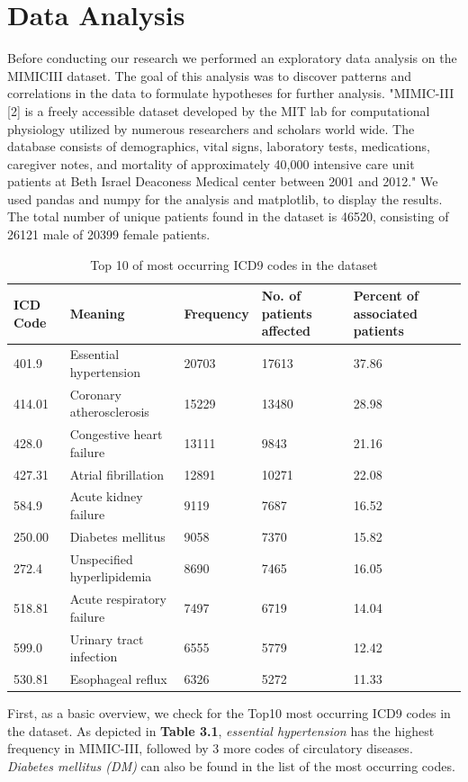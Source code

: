 \documentclass[11pt, a4paper]{book}
\begin{document}
\chapter{Data Analysis}
Before conducting our research we performed an exploratory data analysis on the MIMICIII dataset. The goal of this analysis was to discover patterns and correlations in the data to formulate hypotheses for further analysis. "MIMIC-III [2] is a freely accessible dataset developed by the MIT lab for computational physiology utilized by numerous researchers and scholars world wide. The database consists of demographics, vital signs, laboratory tests, medications, caregiver notes, and mortality of approximately 40,000 intensive care unit patients at Beth Israel Deaconess Medical center between 2001 and 2012." \cite{arya2019exploratory}
We used pandas and numpy for the analysis and matplotlib, to display the results.
The total number of unique patients found in the dataset is 46520, consisting of 26121 male of 20399 female patients.


\begin{table}
\begin{tabular}{l|l|l|l|l}
ICD Code & Meaning & Frequency & No. of patients affected & Percent of associated patients \\
\hline
401.9 & Essential hypertension & 20703 & 17613 & 37.86\\
414.01 &  Coronary atherosclerosis & 15229 & 13480 & 28.98 \\
428.0 & Congestive heart failure &   13111 & 9843 &21.16\\
427.31 & Atrial fibrillation&    12891 & 10271 &  22.08\\
584.9 &  Acute kidney failure &  9119 & 7687& 16.52\\
250.00 & Diabetes mellitus &  9058 & 7370 & 15.82\\
272.4 & Unspecified hyperlipidemia & 8690 & 7465 & 16.05 \\
518.81 &  Acute respiratory failure & 7497 & 6719 & 14.04 \\
599.0 &   Urinary tract infection &  6555 & 5779 & 12.42 \\
530.81 & Esophageal reflux &  6326 & 5272 & 11.33\\
\end{tabular}
\caption{\label{tab:top10-codes-dataset}Top 10 of most occurring ICD9 codes in the dataset}
\end{table}


First, as a basic overview, we check for the Top10 most occurring ICD9 codes in the dataset. As depicted in \textbf{Table 3.1}, \textit{essential hypertension} has the highest frequency in MIMIC-III, followed by 3 more codes of circulatory diseases. \textit{Diabetes mellitus (DM)} can also be found in the list of the most occurring codes.
\end{document}
